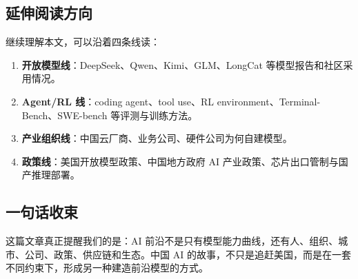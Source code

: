 \subsection{延伸阅读方向}

继续理解本文，可以沿着四条线读：

\begin{enumerate}[leftmargin=1.5em]
    \item \textbf{开放模型线}：DeepSeek、Qwen、Kimi、GLM、LongCat 等模型报告和社区采用情况。
    \item \textbf{Agent/RL 线}：coding agent、tool use、RL environment、Terminal-Bench、SWE-bench 等评测与训练方法。
    \item \textbf{产业组织线}：中国云厂商、业务公司、硬件公司为何自建模型。
    \item \textbf{政策线}：美国开放模型政策、中国地方政府 AI 产业政策、芯片出口管制与国产推理部署。
\end{enumerate}

\subsection{一句话收束}

这篇文章真正提醒我们的是：AI 前沿不是只有模型能力曲线，还有人、组织、城市、公司、政策、供应链和生态。中国 AI 的故事，不只是追赶美国，而是在一套不同约束下，形成另一种建造前沿模型的方式。


